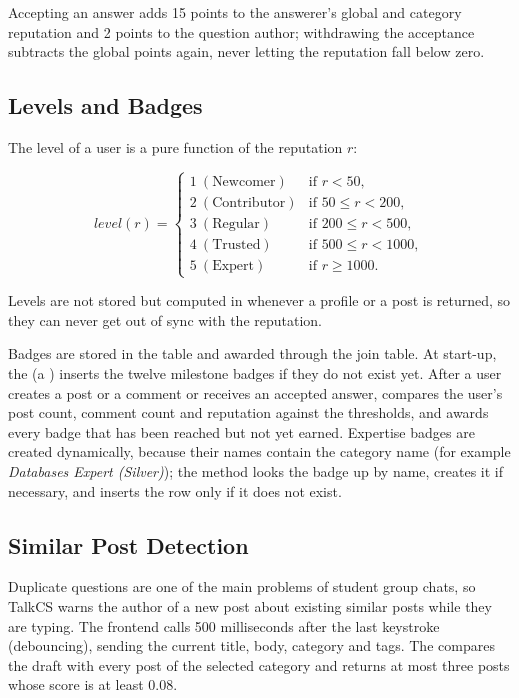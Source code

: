 Accepting an answer adds 15 points to the answerer's global and category reputation
and 2 points to the question author; withdrawing the acceptance subtracts the global
points again, never letting the reputation fall below zero.

\subsection{Levels and Badges}

The level of a user is a pure function of the reputation $r$:

\begin{equation}
  \mathit{level}(r) =
  \begin{cases}
    1 \ (\text{Newcomer}) & \text{if } r < 50,\\
    2 \ (\text{Contributor}) & \text{if } 50 \le r < 200,\\
    3 \ (\text{Regular}) & \text{if } 200 \le r < 500,\\
    4 \ (\text{Trusted}) & \text{if } 500 \le r < 1000,\\
    5 \ (\text{Expert}) & \text{if } r \ge 1000.
  \end{cases}
\end{equation}

Levels are not stored but computed in  whenever a profile or a post
is returned, so they can never get out of sync with the reputation.

Badges are stored in the  table and awarded through the 
join table. At start-up, the  (a )
inserts the twelve milestone badges if they do not exist yet. After a user creates a
post or a comment or receives an accepted answer, 
compares the user's post count, comment count and reputation against the thresholds,
and awards every badge that has been reached but not yet earned. Expertise badges are
created dynamically, because their names contain the category name (for example
\emph{Databases Expert (Silver)}); the method  looks the badge up by name,
creates it if necessary, and inserts the  row only if it does not exist.

\subsection{Similar Post Detection}
\label{sec:similarity}

Duplicate questions are one of the main problems of student group chats, so TalkCS
warns the author of a new post about existing similar posts while they are typing. The
frontend calls  500 milliseconds after the last keystroke
(debouncing), sending the current title, body, category and tags. The
 compares the draft with every post of the selected category and
returns at most three posts whose score is at least 0.08.

